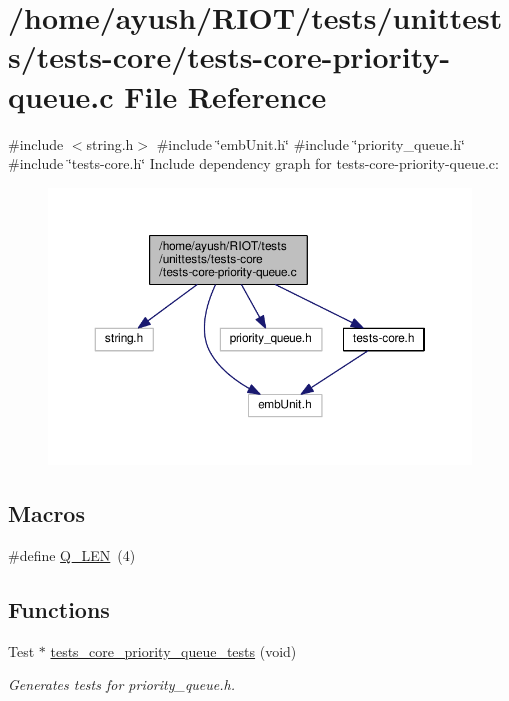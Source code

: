 \hypertarget{tests-core-priority-queue_8c}{}\section{/home/ayush/\+R\+I\+O\+T/tests/unittests/tests-\/core/tests-\/core-\/priority-\/queue.c File Reference}
\label{tests-core-priority-queue_8c}
{\ttfamily \#include $<$string.\+h$>$}\newline
{\ttfamily \#include \char`\"{}emb\+Unit.\+h\char`\"{}}\newline
{\ttfamily \#include \char`\"{}priority\+\_\+queue.\+h\char`\"{}}\newline
{\ttfamily \#include \char`\"{}tests-\/core.\+h\char`\"{}}\newline
Include dependency graph for tests-\/core-\/priority-\/queue.c\+:
\nopagebreak
\begin{figure}[H]
\begin{center}
\leavevmode
\includegraphics[width=350pt]{tests-core-priority-queue_8c__incl}
\end{center}
\end{figure}
\subsection*{Macros}
\begin{DoxyCompactItemize}
\item 
\#define \hyperlink{tests-core-priority-queue_8c_a7e595e20632efe0313f9aebc1fb0bde0}{Q\+\_\+\+L\+EN}~(4)
\end{DoxyCompactItemize}
\subsection*{Functions}
\begin{DoxyCompactItemize}
\item 
Test $\ast$ \hyperlink{group__unittests_ga5f7e66228b199fc4a8938d67b5bfbdce}{tests\+\_\+core\+\_\+priority\+\_\+queue\+\_\+tests} (void)
\begin{DoxyCompactList}\small\item\em Generates tests for priority\+\_\+queue.\+h. \end{DoxyCompactList}\end{DoxyCompactItemize}


